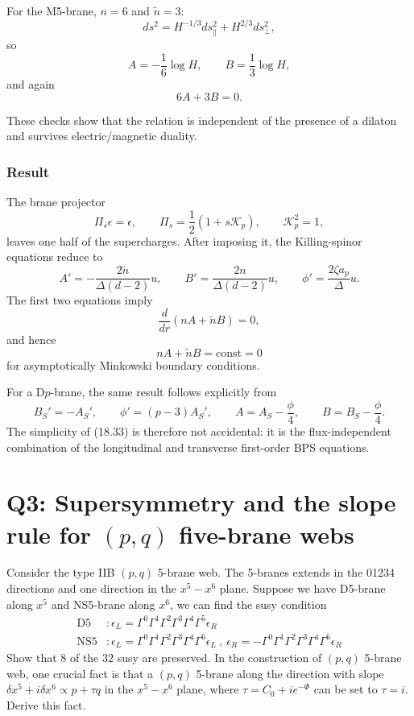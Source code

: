 \documentclass[
  10pt,
  a4paper,
  openany]{book}
\begin{document}
For the M5-brane, \(n=6\) and \(\tilde n=3\): \[
ds^2=H^{-1/3}ds_\parallel^2+H^{2/3}ds_\perp^2,
\] so \[
A=-\frac16\log H,
\qquad
B=\frac13\log H,
\] and again \[
6A+3B=0.
\]

These checks show that the relation is independent of the presence of a
dilaton and survives electric/magnetic duality.

\subsubsection{Result}\label{result-37}

The brane projector \[
\Pi_s\epsilon=\epsilon,
\qquad
\Pi_s=\frac12(1+s\mathcal K_p),
\qquad
\mathcal K_p^2=1,
\] leaves one half of the supercharges. After imposing it, the
Killing-spinor equations reduce to \[
\boxed{
A'=-\frac{2\tilde n}{\Delta(d-2)}u,
\qquad
B'=\frac{2n}{\Delta(d-2)}u,
\qquad
\phi'=\frac{2\zeta a_p}{\Delta}u
}.
\] The first two equations imply \[
\boxed{
\frac{d}{dr}(nA+\tilde nB)=0
},
\] and hence \[
\boxed{
nA+\tilde nB=\mathrm{const}=0
}
\] for asymptotically Minkowski boundary conditions.

For a D\(p\)-brane, the same result follows explicitly from \[
B_S'=-A_S',
\qquad
\phi'=(p-3)A_S',
\qquad
A=A_S-\frac{\phi}{4},
\qquad
B=B_S-\frac{\phi}{4}.
\] The simplicity of (18.33) is therefore not accidental: it is the
flux-independent combination of the longitudinal and transverse
first-order BPS equations.

\section{\texorpdfstring{Q3: Supersymmetry and the slope rule for
\((p,q)\) five-brane
webs}{Q3: Supersymmetry and the slope rule for (p,q) five-brane webs}}\label{q3-supersymmetry-and-the-slope-rule-for-pq-five-brane-webs}

Consider the type IIB \((p,q)\) 5-brane web. The 5-branes extends in the
01234 directions and one direction in the \(x^5-x^6\) plane. Suppose we
have D5-brane along \(x^5\) and NS5-brane along \(x^6\), we can find the
susy condition \[
\begin{aligned}
\text{D5}&:\epsilon_{L}=\Gamma^0\Gamma^1\Gamma^2\Gamma^3\Gamma^4\Gamma^5\epsilon_{R}\\
\text{NS5}&:\epsilon_{L}=\Gamma^0\Gamma^1\Gamma^2\Gamma^3\Gamma^4\Gamma^6\epsilon_{L} \ , \ \epsilon_{R}=-\Gamma^0\Gamma^1\Gamma^2\Gamma^3\Gamma^4\Gamma^6\epsilon_{R} 
\end{aligned}
\] Show that 8 of the 32 susy are preserved. In the construction of
\((p,q)\) 5-brane web, one crucial fact is that a \((p,q)\) 5-brane
along the direction with slope
\(\delta x^5+i\delta x^6\propto p+\tau q\) in the \(x^5-x^6\) plane,
where \(\tau=C_{0}+ie^{-\Phi}\) can be set to \(\tau=i\). Derive this
fact.
\end{document}
